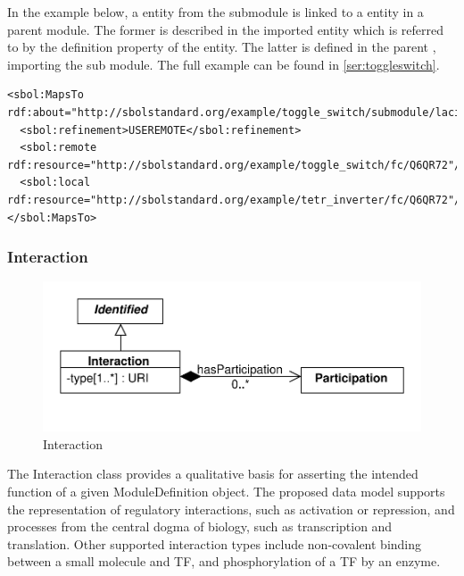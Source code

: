 In the example below, a  entity from the submodule is linked to a  entity in a parent module. The former is described in the imported  entity which is referred to by the definition property of the  entity. The latter is defined in the parent , importing the sub module. The full example can be found in \ref{ser:toggleswitch}.
\begin{lstlisting}
<sbol:MapsTo rdf:about="http://sbolstandard.org/example/toggle_switch/submodule/laci_inverter/mapping/Q6QR72">
  <sbol:refinement>USEREMOTE</sbol:refinement>
  <sbol:remote rdf:resource="http://sbolstandard.org/example/toggle_switch/fc/Q6QR72"/>
  <sbol:local rdf:resource="http://sbolstandard.org/example/tetr_inverter/fc/Q6QR72"/>
</sbol:MapsTo>
\end{lstlisting}



\subsubsection{Interaction}
\label{sec:Interaction}

\begin{figure}[ht]
\begin{center}
\includegraphics[scale=0.6]{uml/interaction}
\caption[]{Interaction}
\label{uml:interaction}
\end{center}
\end{figure}

The Interaction class provides a qualitative basis for asserting the intended function of a given ModuleDefinition object. The proposed data model supports the representation of regulatory interactions, such as activation or repression, and processes from the central dogma of biology, such as transcription and translation. Other supported interaction types include non-covalent binding between a small molecule and TF, and phosphorylation of a TF by an enzyme. 

